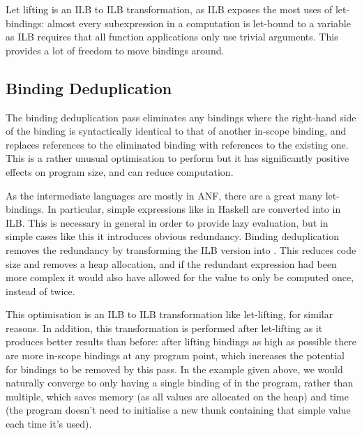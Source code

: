 \documentclass[dissertation.tex]{subfiles}
\begin{document}
{{        Let lifting is an ILB to ILB transformation, as ILB exposes the most uses of let-bindings: almost every
        subexpression in a computation is let-bound to a variable as ILB requires that all function applications
        only use trivial arguments. This provides a lot of freedom to move bindings around.


    }
    \subsection{Binding Deduplication}\label{sec:binding-dedupe}
    {

        The binding deduplication pass eliminates any bindings where the right-hand side of the binding is
        syntactically identical to that of another in-scope binding, and replaces references to the eliminated
        binding with references to the existing one. This is a rather unusual optimisation to perform but it has
        significantly positive effects on program size, and can reduce computation.

        As the intermediate languages are mostly in ANF, there are a great many let-bindings. In particular, simple
        expressions like  in Haskell are converted into  in ILB. This is necessary in general in order to provide lazy evaluation, but in simple
        cases like this it introduces obvious redundancy. Binding deduplication removes the redundancy by
        transforming the ILB version into . This reduces code size and removes
        a heap allocation, and if the redundant expression had been more complex it would also have allowed for the
        value to only be computed once, instead of twice.

        This optimisation is an ILB to ILB transformation like let-lifting, for similar reasons. In addition, this
        transformation is performed after let-lifting as it produces better results than before: after lifting
        bindings as high as possible there are more in-scope bindings at any program point, which increases the
        potential for bindings to be removed by this pass. In the  example given above, we
        would naturally converge to only having a single binding of  in the program, rather than
        multiple, which saves memory (as all values are allocated on the heap) and time (the program doesn't need to
        initialise a new thunk containing that simple value each time it's used).

}}
\end{document}
